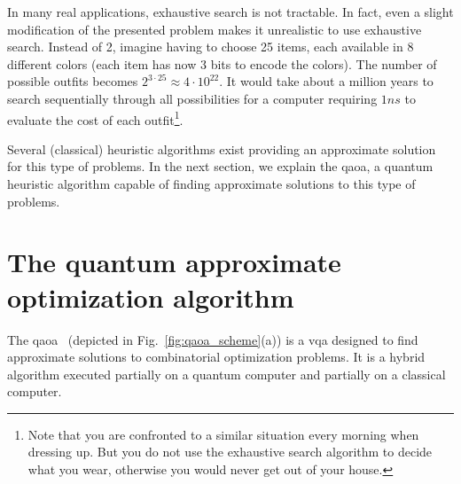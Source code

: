 In many real applications, exhaustive search is not tractable. In fact, even a slight modification of the presented problem makes it unrealistic to use exhaustive search. Instead of 2, imagine having to choose 25 items, each available in 8 different colors (each item has now 3 bits to encode the colors). The number of possible outfits becomes $2^{3 \cdot 25} \approx 4\cdot 10^{22}$. It would take about a million years to search sequentially through all possibilities for a computer requiring $1\unit{ns}$ to evaluate the cost of each outfit\footnote{Note that you are confronted to a similar situation every morning when dressing up. But you do not use the exhaustive search algorithm to decide what you wear, otherwise you would never get out of your house.}.

Several (classical) heuristic algorithms exist providing an approximate solution for this type of problems. In the next section, we explain the \gls{qaoa}, a quantum heuristic algorithm capable of finding approximate solutions to this type of problems.

\section{The quantum approximate optimization algorithm}\label{sec:qaoa}
The \gls{qaoa}~\cite{Farhi2014AAlgorithm} (depicted in Fig.~\ref{fig:qaoa_scheme}(a)) is a \gls{vqa} designed to find approximate solutions to combinatorial optimization problems. It is a hybrid algorithm executed partially on a quantum computer and partially on a classical computer. 


